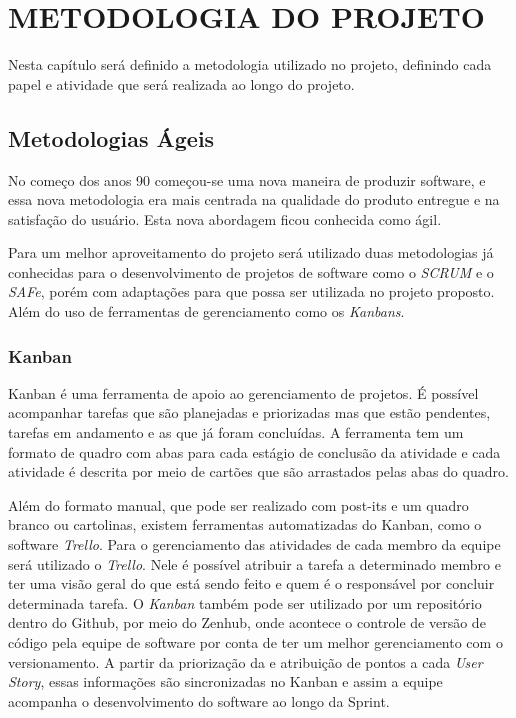 \chapter[Metodologia do projeto]{METODOLOGIA DO PROJETO}

Nesta capítulo será definido a metodologia utilizado no projeto, definindo cada papel e atividade que será realizada ao longo do projeto.

\section{Metodologias Ágeis}

No começo dos anos 90 começou-se uma nova maneira de produzir software, e essa nova metodologia era mais centrada na qualidade do produto entregue e na satisfação do usuário. Esta nova abordagem ficou conhecida como ágil.

Para um melhor aproveitamento do projeto será utilizado duas metodologias já conhecidas para o desenvolvimento de projetos de software como o \textit{SCRUM} e o \textit{SAFe}, porém com adaptações para que possa ser utilizada no projeto proposto. Além do uso de ferramentas de gerenciamento como os \textit{Kanbans}.

\subsection{Kanban}

Kanban é uma ferramenta de apoio ao gerenciamento de projetos. É possível acompanhar tarefas que são planejadas e priorizadas mas que estão pendentes, tarefas em andamento e as que já foram concluídas. A ferramenta tem um formato de quadro com abas para cada estágio de conclusão da atividade e cada atividade é descrita por meio de cartões que são arrastados pelas abas do quadro.

Além do formato manual, que pode ser realizado com post-its e um quadro branco ou cartolinas, existem ferramentas automatizadas do Kanban, como o software \textit{Trello}. Para o gerenciamento das atividades de cada membro da equipe será utilizado o \textit{Trello}. Nele é possível atribuir a tarefa a determinado membro e ter uma visão geral do que está sendo feito e quem é o responsável por concluir determinada tarefa.
O \textit{Kanban} também pode ser utilizado por um repositório dentro do Github, por meio do Zenhub, onde acontece o controle de versão de código pela equipe de software por conta de ter um melhor gerenciamento com o versionamento. A partir da priorização da e atribuição de pontos a cada \textit{User Story}, essas informações são sincronizadas no Kanban e assim a equipe acompanha o desenvolvimento do software ao longo da Sprint.


